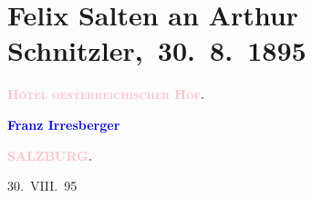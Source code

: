 

\renewcommand{\erwaehntePersonen}{Personen: Lou Andreas-Salomé, Richard Beer-Hofmann, Siegfried Bing, Emma Fr., Vincent van Gogh, Paul Goldmann, Hugo von Hofmannsthal, Franz Irresberger, Karl Kraus, Charlotte Pohl-Glas, Adele Sandrock}
\renewcommand{\erwaehnteOrte}{Orte: Asien, Bad Ischl, Gmunden, Japan, München, Paris, Salzburg, Schafberg (St. Gilgen), Unterach am Attersee, Wien, Österreichischer Hof}
\renewcommand{\erwaehnteWerke}{Werke: Erinnerungen, Ischler Brief. (Wiener Dichter auf der Esplanade.), Wiener Familien-Journal}
\section[ Felix Salten an Arthur Schnitzler, 30. 8. 1895]{Felix Salten an Arthur Schnitzler, 30. 8. 1895}
\nopagebreak{}
\rehead{ }\normalsize\beginnumbering{}
\toendnotes[C]{\smallbreak\pagebreak[2]}
\toendnotes[C]{\smallbreak}
\pstart
           \noindent{}\centering{}{\pb}\textcolor{gray}{\textbf{\textsc{\textcolor{pink}{Hôtel oesterreichischer Hof}{}\ledrightnote{\textcolor{pink}{Österreichischer Hof}}}.}}\pend
           
\pstart
           \noindent{}\centering{}\textcolor{gray}{\textbf{\textcolor{blue}{Franz Irresberger}{}\ledrightnote{\textcolor{blue}{Franz Irresberger}}}}\pend
           
\pstart
           \noindent{}\centering{}\textcolor{gray}{\textbf{\textcolor{pink}{SALZBURG}{}\ledrightnote{\textcolor{pink}{Salzburg}}.}}\pend
           
\pstart
           \raggedleft{}30. VIII. 95\pend
           
